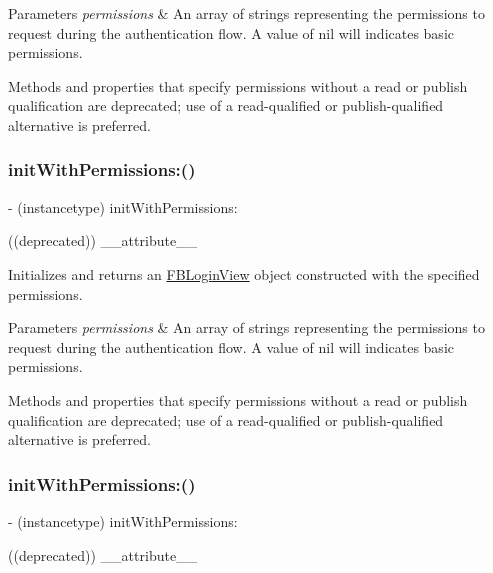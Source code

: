 \begin{DoxyParams}{Parameters}
{\em permissions} & An array of strings representing the permissions to request during the authentication flow. A value of nil will indicates basic permissions.\\
\hline
\end{DoxyParams}
Methods and properties that specify permissions without a read or publish qualification are deprecated; use of a read-\/qualified or publish-\/qualified alternative is preferred. \mbox{\label{interfaceFBLoginView_a0fb6885fd07aa64c90378c9abcfd06a4}} 
\subsubsection{\texorpdfstring{init\+With\+Permissions\+:()}{initWithPermissions:()}\hspace{0.1cm}{\footnotesize\ttfamily [4/5]}}
{\footnotesize\ttfamily -\/ (instancetype) init\+With\+Permissions\+: \begin{DoxyParamCaption}\item[{((deprecated))}]{\+\_\+\+\_\+attribute\+\_\+\+\_\+ }\end{DoxyParamCaption}}

Initializes and returns an {\ttfamily \hyperlink{interfaceFBLoginView}{F\+B\+Login\+View}} object constructed with the specified permissions.


\begin{DoxyParams}{Parameters}
{\em permissions} & An array of strings representing the permissions to request during the authentication flow. A value of nil will indicates basic permissions.\\
\hline
\end{DoxyParams}
Methods and properties that specify permissions without a read or publish qualification are deprecated; use of a read-\/qualified or publish-\/qualified alternative is preferred. \mbox{\label{interfaceFBLoginView_a0fb6885fd07aa64c90378c9abcfd06a4}} 
\subsubsection{\texorpdfstring{init\+With\+Permissions\+:()}{initWithPermissions:()}\hspace{0.1cm}{\footnotesize\ttfamily [5/5]}}
{\footnotesize\ttfamily -\/ (instancetype) init\+With\+Permissions\+: \begin{DoxyParamCaption}\item[{((deprecated))}]{\+\_\+\+\_\+attribute\+\_\+\+\_\+ }\end{DoxyParamCaption}}


